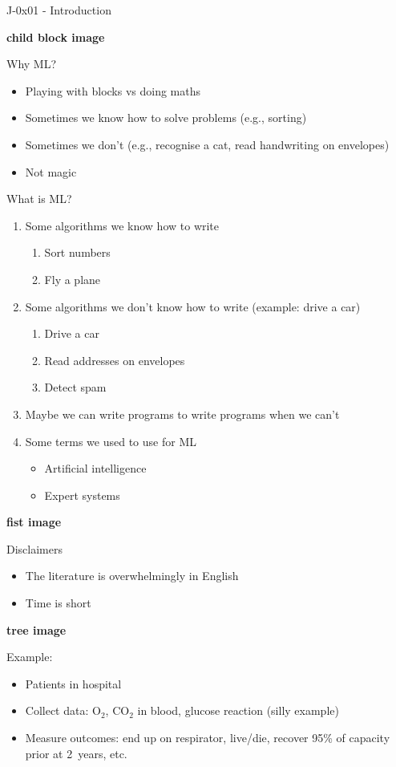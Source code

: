 \documentclass{article}
\begin{document}
\centerline{\Large J-0x01 - Introduction}
\vspace{5mm}

\textbf{child block image}

Why ML?
\begin{itemize}
\item Playing with blocks vs doing maths
\item Sometimes we know how to solve problems (e.g., sorting)
\item Sometimes we don't (e.g., recognise a cat, read handwriting on envelopes)
\item Not magic
\end{itemize}

What is ML?
\begin{enumerate}
\item Some algorithms we know how to write
  \begin{enumerate}
  \item Sort numbers
  \item Fly a plane
  \end{enumerate}
\item Some algorithms we don't know how to write (example: drive a car)
  \begin{enumerate}
  \item Drive a car 
  \item Read addresses on envelopes
  \item Detect spam
  \end{enumerate}
\item Maybe we can write programs to write programs when we can't
\item Some terms we used to use for ML
  \begin{itemize}
  \item Artificial intelligence
  \item Expert systems
  \end{itemize}
\end{enumerate}

\textbf{fist image}

Disclaimers
\begin{itemize}
\item The literature is overwhelmingly in English
\item Time is short
\end{itemize}

\textbf{tree image}

Example:
\begin{itemize}
\item Patients in hospital
\item Collect data: O$_2$, CO$_2$ in blood, glucose reaction (silly example)
\item Measure outcomes: end up on respirator, live/die, recover 95\%
  of capacity prior at 2~years, etc.
\end{itemize}
\end{document}

